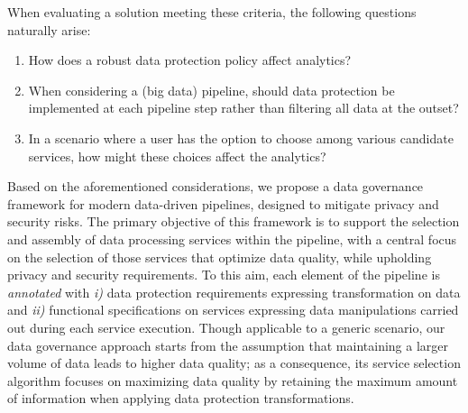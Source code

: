 When evaluating a solution meeting these criteria, the following questions naturally arise:
\begin{enumerate}
\item How does a robust data protection policy affect analytics?
\item When considering a (big data) pipeline, should data protection be implemented at each pipeline step rather than filtering all data at the outset? 
\item In a scenario where a user has the option to choose among various candidate services, how might these choices affect the analytics?
\end{enumerate}

Based on the aforementioned considerations, we propose a data governance framework for modern data-driven pipelines, designed to mitigate privacy and security risks. The primary objective of this framework is to support the selection and assembly of data processing services within the pipeline, with a central focus on the selection of those services that optimize data quality, while upholding privacy and security requirements. 
To this aim, each element of the pipeline is \textit{annotated} with \emph{i)} data protection requirements expressing transformation on data and \emph{ii)} functional specifications on services expressing data manipulations carried out during each service execution. 
Though applicable to a generic scenario, our data governance approach starts from the assumption that maintaining a larger volume of data leads to higher data quality; as a consequence, its service selection algorithm focuses on maximizing data quality by retaining the maximum amount of information when applying data protection transformations. 

